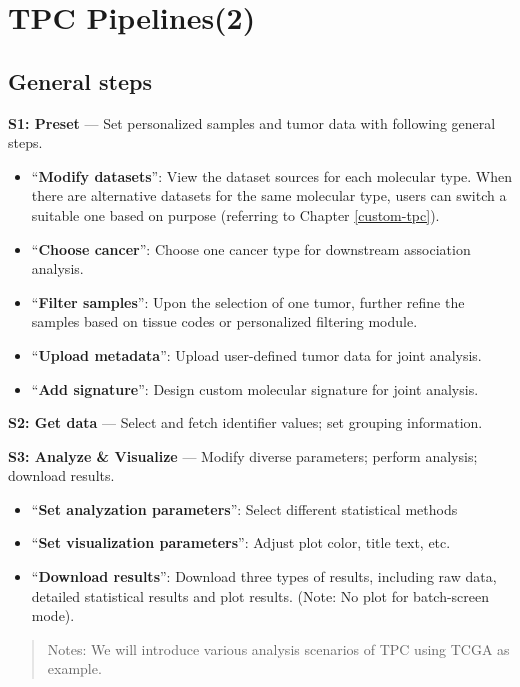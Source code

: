 \documentclass[
]{book}
\providecommand{\tightlist}{%
  \setlength{\itemsep}{0pt}\setlength{\parskip}{0pt}}
\begin{document}
\chapter{TPC Pipelines(2)}\label{per-tpc-2}

\section{General steps}\label{general-steps}

\textbf{S1: Preset} --- Set personalized samples and tumor data with following general steps.

\begin{itemize}
\tightlist
\item
  ``\textbf{Modify datasets}'': View the dataset sources for each molecular type. When there are alternative datasets for the same molecular type, users can switch a suitable one based on purpose (referring to Chapter \ref{custom-tpc}).
\item
  ``\textbf{Choose cancer}'': Choose one cancer type for downstream association analysis.
\item
  ``\textbf{Filter samples}'': Upon the selection of one tumor, further refine the samples based on tissue codes or personalized filtering module.
\item
  ``\textbf{Upload metadata}'': Upload user-defined tumor data for joint analysis.
\item
  ``\textbf{Add signature}'': Design custom molecular signature for joint analysis.
\end{itemize}

\textbf{S2: Get data} --- Select and fetch identifier values; set grouping information.

\textbf{S3: Analyze \& Visualize} --- Modify diverse parameters; perform analysis; download results.

\begin{itemize}
\tightlist
\item
  ``\textbf{Set analyzation parameters}'': Select different statistical methods
\item
  ``\textbf{Set visualization parameters}'': Adjust plot color, title text, etc.
\item
  ``\textbf{Download results}'': Download three types of results, including raw data, detailed statistical results and plot results. (Note: No plot for batch-screen mode).
\end{itemize}

\begin{quote}
Notes: We will introduce various analysis scenarios of TPC using TCGA as example.
\end{quote}
\end{document}
